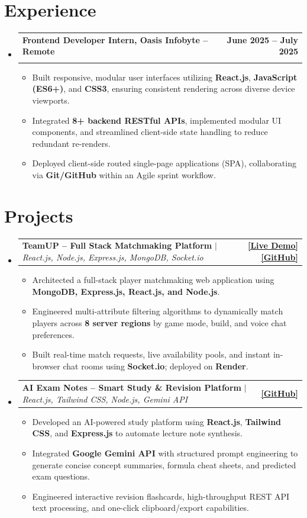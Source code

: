 \documentclass[letterpaper,10pt]{article}
\makeatletter
\newcommand{\resumeItem}[1]{
  \item\small{{#1 \vspace{1.5pt}}}
}
\newcommand{\resumeSubheading}[4]{
  \item
    \begin{tabular*}{1.0\textwidth}[t]{l@{\extracolsep{\fill}}r}
      \textbf{#1} & \textbf{\small #2} \\
      \textit{\small#3} & \textit{\small #4} \\
    \end{tabular*}\vspace{-3pt}
}
\newcommand{\resumeProjectHeading}[2]{
  \item
    \begin{tabular*}{1.0\textwidth}{l@{\extracolsep{\fill}}r}
      \small#1 & \textbf{\small #2} \\
    \end{tabular*}\vspace{-3pt}
}
\newcommand{\resumeSubHeadingListStart}{\begin{itemize}[leftmargin=0.0in, label={}, itemsep=3pt]}
\newcommand{\resumeSubHeadingListEnd}{\end{itemize}}
\newcommand{\resumeItemListStart}{\begin{itemize}[leftmargin=0.18in, itemsep=2.5pt, topsep=2pt]}
\newcommand{\resumeItemListEnd}{\end{itemize}\vspace{-2pt}}
\makeatother
\begin{document}
\section{Experience}
  \resumeSubHeadingListStart
    \resumeSubheading
      {Frontend Developer Intern, Oasis Infobyte -- Remote}{June 2025 -- July 2025}
      {}{}\vspace{-10pt}
      \resumeItemListStart
        \resumeItem{Built responsive, modular user interfaces utilizing \textbf{React.js}, \textbf{JavaScript (ES6+)}, and \textbf{CSS3}, ensuring consistent rendering across diverse device viewports.}
        \resumeItem{Integrated \textbf{8+ backend RESTful APIs}, implemented modular UI components, and streamlined client-side state handling to reduce redundant re-renders.}
        \resumeItem{Deployed client-side routed single-page applications (SPA), collaborating via \textbf{Git/GitHub} within an Agile sprint workflow.}
      \resumeItemListEnd
  \resumeSubHeadingListEnd

\section{Projects}
  \resumeSubHeadingListStart
    \resumeProjectHeading
      {\textbf{TeamUP -- Full Stack Matchmaking Platform} $|$ \emph{React.js, Node.js, Express.js, MongoDB, Socket.io}}{
        \href{https://yourliveprojectlink.com}{\underline{[Live Demo]}} \ \href{https://github.com/rishifishyy}{\underline{[GitHub]}}
      }
      \resumeItemListStart
        \resumeItem{Architected a full-stack player matchmaking web application using \textbf{MongoDB, Express.js, React.js, and Node.js}.}
        \resumeItem{Engineered multi-attribute filtering algorithms to dynamically match players across \textbf{8 server regions} by game mode, build, and voice chat preferences.}
        \resumeItem{Built real-time match requests, live availability pools, and instant in-browser chat rooms using \textbf{Socket.io}; deployed on \textbf{Render}.}
      \resumeItemListEnd

    \resumeProjectHeading
      {\textbf{AI Exam Notes -- Smart Study \& Revision Platform} $|$ \emph{React.js, Tailwind CSS, Node.js, Gemini API}}{
        \href{https://github.com/rishifishyy}{\underline{[GitHub]}}
      }
      \resumeItemListStart
        \resumeItem{Developed an AI-powered study platform using \textbf{React.js}, \textbf{Tailwind CSS}, and \textbf{Express.js} to automate lecture note synthesis.}
        \resumeItem{Integrated \textbf{Google Gemini API} with structured prompt engineering to generate concise concept summaries, formula cheat sheets, and predicted exam questions.}
        \resumeItem{Engineered interactive revision flashcards, high-throughput REST API text processing, and one-click clipboard/export capabilities.}
      \resumeItemListEnd
  \resumeSubHeadingListEnd
\end{document}
